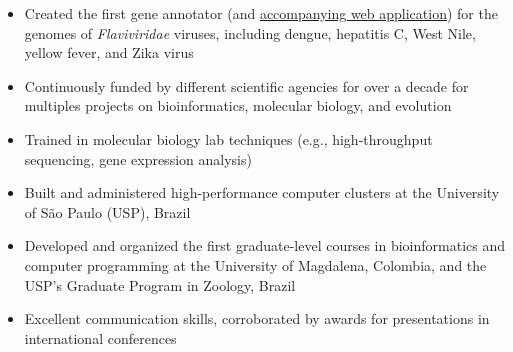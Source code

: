     \begin{itemize}
        \item Created the first gene annotator (and \href{http://flavi-web.com/}{accompanying web application}) for the genomes of \textit{Flaviviridae} viruses, including dengue, hepatitis C, West Nile, yellow fever, and Zika virus
        \item Continuously funded by different scientific agencies for over a decade for multiples projects on bioinformatics, molecular biology, and evolution
        \item Trained in molecular biology lab techniques (e.g., high-throughput sequencing, gene expression analysis)
        \item Built and administered high-performance computer clusters at the University of São Paulo (USP), Brazil
        \item Developed and organized the first graduate-level courses in bioinformatics and computer programming at the University of Magdalena, Colombia, and the USP's Graduate Program in Zoology, Brazil
        \item Excellent communication skills, corroborated by awards for presentations in international conferences
    \end{itemize}

    \vspace{-0.5em}
